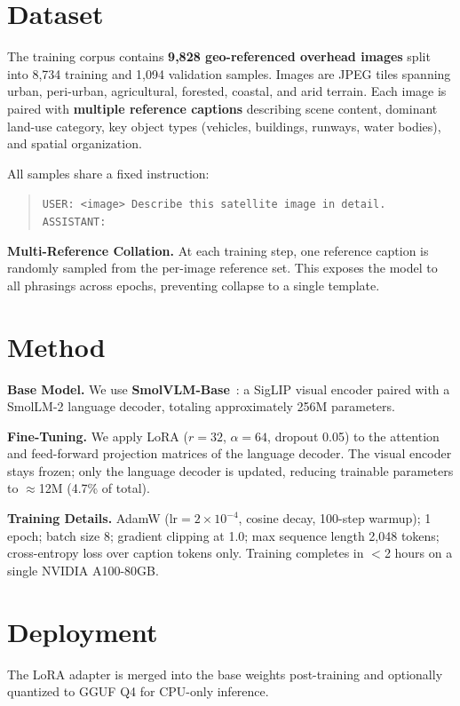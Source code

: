 \documentclass[conference]{IEEEtran}
\begin{document}
\section{Dataset}
\label{sec:dataset}

The training corpus contains \textbf{9,828 geo-referenced overhead images} split into 8,734
training and 1,094 validation samples. Images are JPEG tiles spanning urban, peri-urban,
agricultural, forested, coastal, and arid terrain. Each image is paired with \textbf{multiple
reference captions} describing scene content, dominant land-use category, key object types
(vehicles, buildings, runways, water bodies), and spatial organization.

All samples share a fixed instruction:
\begin{quote}
\small\texttt{USER: <image> Describe this satellite image in detail. ASSISTANT:}
\end{quote}

\textbf{Multi-Reference Collation.}
At each training step, one reference caption is randomly sampled from the per-image reference set.
This exposes the model to all phrasings across epochs, preventing collapse to a single template.

\section{Method}
\label{sec:method}

\textbf{Base Model.}
We use \textbf{SmolVLM-Base}~\cite{smolvlm}: a SigLIP visual encoder paired with a SmolLM-2
language decoder, totaling approximately 256M parameters.

\textbf{Fine-Tuning.}
We apply LoRA ($r=32$, $\alpha=64$, dropout 0.05) to the attention and feed-forward projection
matrices of the language decoder. The visual encoder stays frozen; only the language decoder is
updated, reducing trainable parameters to $\approx$12M (4.7\% of total).

\textbf{Training Details.}
AdamW (lr$=2\times10^{-4}$, cosine decay, 100-step warmup); 1 epoch; batch size 8; gradient
clipping at 1.0; max sequence length 2,048 tokens; cross-entropy loss over caption tokens only.
Training completes in $<$2 hours on a single NVIDIA A100-80GB.

\section{Deployment}
\label{sec:deployment}

The LoRA adapter is merged into the base weights post-training and optionally quantized to GGUF Q4
for CPU-only inference.
\end{document}
